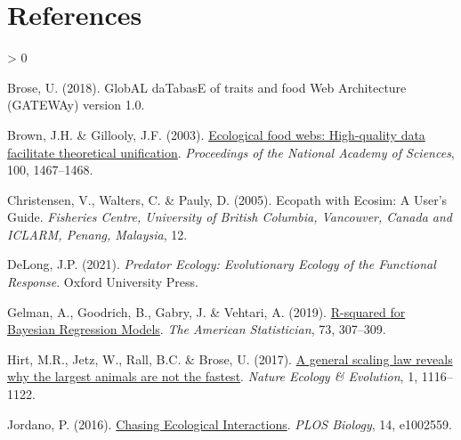 \documentclass[10pt,oneside]{article}
\newlength{\cslhangindent}
\newenvironment{CSLReferences}[2] %
 {%
  \setlength{\parindent}{0pt}
  \ifodd #1 \everypar{\setlength{\hangindent}{\cslhangindent}}\ignorespaces\fi
  \ifnum #2 > 0
  \setlength{\parskip}{#2\baselineskip}
  \fi
 }%
 {}
\begin{document}
\hypertarget{references}{%
\section*{References}\label{references}}

\hypertarget{refs}{}
\begin{CSLReferences}{1}{0}
\leavevmode{}%
Brose, U. (2018). GlobAL daTabasE of traits and food Web Architecture
(GATEWAy) version 1.0.

\leavevmode{}%
Brown, J.H. \& Gillooly, J.F. (2003).
\href{https://doi.org/10.1073/pnas.0630310100}{Ecological food webs:
High-quality data facilitate theoretical unification}. \emph{Proceedings
of the National Academy of Sciences}, 100, 1467--1468.

\leavevmode{}%
Christensen, V., Walters, C. \& Pauly, D. (2005). Ecopath with Ecosim: A
User's Guide. \emph{Fisheries Centre, University of British Columbia,
Vancouver, Canada and ICLARM, Penang, Malaysia}, 12.

\leavevmode{}%
DeLong, J.P. (2021). \emph{Predator Ecology: Evolutionary Ecology of the
Functional Response}. Oxford University Press.

\leavevmode{}%
Gelman, A., Goodrich, B., Gabry, J. \& Vehtari, A. (2019).
\href{https://doi.org/10.1080/00031305.2018.1549100}{R-squared for
Bayesian Regression Models}. \emph{The American Statistician}, 73,
307--309.

\leavevmode{}%
Hirt, M.R., Jetz, W., Rall, B.C. \& Brose, U. (2017).
\href{https://doi.org/10.1038/s41559-017-0241-4}{A general scaling law
reveals why the largest animals are not the fastest}. \emph{Nature
Ecology \& Evolution}, 1, 1116--1122.

\leavevmode{}%
Jordano, P. (2016).
\href{https://doi.org/10.1371/journal.pbio.1002559}{Chasing Ecological
Interactions}. \emph{PLOS Biology}, 14, e1002559.

\end{CSLReferences}
\end{document}
